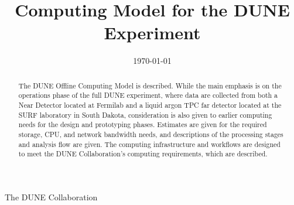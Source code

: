 \documentclass[12pt]{article}
\begin{document}

\title{Computing Model for the DUNE Experiment}

\date{\today}

\maketitle

\centerline{The DUNE Collaboration}



\vspace{2cm}

\begin{abstract}
The DUNE Offline Computing Model is described.  While the main emphasis is
on the operations phase of the full DUNE experiment, where data are collected
from both a Near Detector located at Fermilab and a liquid argon TPC far detector
located at the SURF laboratory in South Dakota, consideration is also given
to earlier computing needs for the design and prototyping phases.  Estimates
are given for the required storage, CPU, and network bandwidth needs, and descriptions
of the processing stages and analysis flow are given.  The computing infrastructure
and workflows are designed to meet the DUNE Collaboration's computing requirements,
which are described.
\end{abstract}


\newpage
%

\newpage
\tableofcontents
\newpage
\listoftables
\newpage
\listoffigures


\newpage



\newpage


\newpage


\newpage



\newpage


\newpage


\newpage

\end{document}
